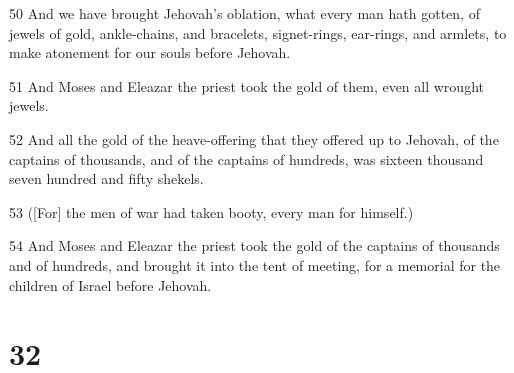 \par 50 And we have brought Jehovah's oblation, what every man hath gotten, of jewels of gold, ankle-chains, and bracelets, signet-rings, ear-rings, and armlets, to make atonement for our souls before Jehovah.
\par 51 And Moses and Eleazar the priest took the gold of them, even all wrought jewels.
\par 52 And all the gold of the heave-offering that they offered up to Jehovah, of the captains of thousands, and of the captains of hundreds, was sixteen thousand seven hundred and fifty shekels.
\par 53 ([For] the men of war had taken booty, every man for himself.)
\par 54 And Moses and Eleazar the priest took the gold of the captains of thousands and of hundreds, and brought it into the tent of meeting, for a memorial for the children of Israel before Jehovah.

\chapter{32}

